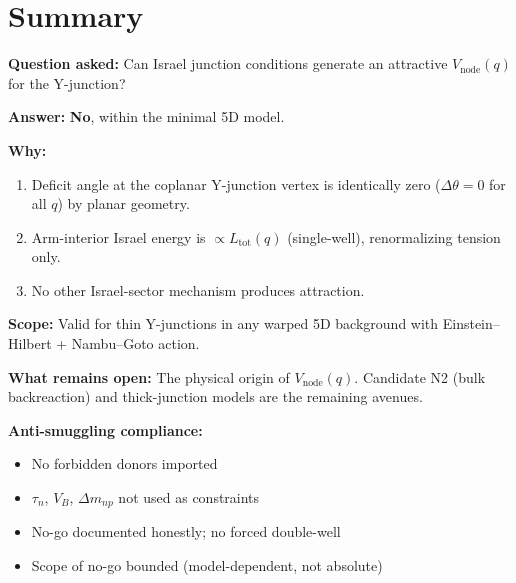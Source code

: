 \section{Summary}
\label{sec:P2WP2:summary}

\begin{resultbox}[title=WP2 Summary]
\textbf{Question asked:} Can Israel junction conditions generate an
attractive $V_{\mathrm{node}}(q)$ for the Y-junction?

\textbf{Answer:} \textbf{No}, within the minimal 5D model.

\textbf{Why:}
\begin{enumerate}
    \item Deficit angle at the coplanar Y-junction vertex is identically
          zero ($\Delta\theta = 0$ for all $q$) by planar geometry.
    \item Arm-interior Israel energy is $\propto L_{\mathrm{tot}}(q)$
          (single-well), renormalizing tension only.
    \item No other Israel-sector mechanism produces attraction.
\end{enumerate}

\textbf{Scope:} Valid for thin Y-junctions in any warped 5D background
with Einstein--Hilbert + Nambu--Goto action.

\textbf{What remains open:} The physical origin of
$V_{\mathrm{node}}(q)$. Candidate N2 (bulk backreaction) and
thick-junction models are the remaining avenues.

\textbf{Anti-smuggling compliance:}
\begin{itemize}
    \item[$\checkmark$] No forbidden donors imported
    \item[$\checkmark$] $\tau_n$, $V_B$, $\Delta m_{np}$ not used as
          constraints
    \item[$\checkmark$] No-go documented honestly; no forced double-well
    \item[$\checkmark$] Scope of no-go bounded (model-dependent, not
          absolute)
\end{itemize}
\end{resultbox}
